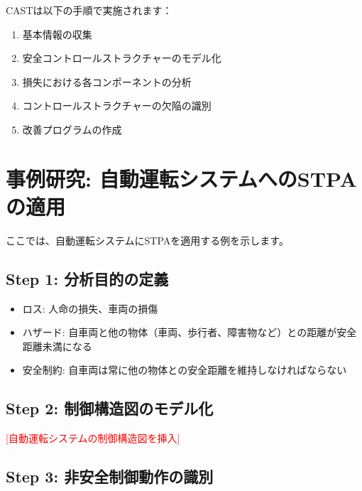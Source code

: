 CASTは以下の手順で実施されます：

\begin{enumerate}
    \item 基本情報の収集
    \item 安全コントロールストラクチャーのモデル化
    \item 損失における各コンポーネントの分析
    \item コントロールストラクチャーの欠陥の識別
    \item 改善プログラムの作成
\end{enumerate}

\section{事例研究: 自動運転システムへのSTPAの適用}

ここでは、自動運転システムにSTPAを適用する例を示します。

\subsection{Step 1: 分析目的の定義}

\begin{itemize}
    \item ロス: 人命の損失、車両の損傷
    \item ハザード: 自車両と他の物体（車両、歩行者、障害物など）との距離が安全距離未満になる
    \item 安全制約: 自車両は常に他の物体との安全距離を維持しなければならない
\end{itemize}

\subsection{Step 2: 制御構造図のモデル化}

\textcolor{red}{[自動運転システムの制御構造図を挿入]}

\subsection{Step 3: 非安全制御動作の識別}

